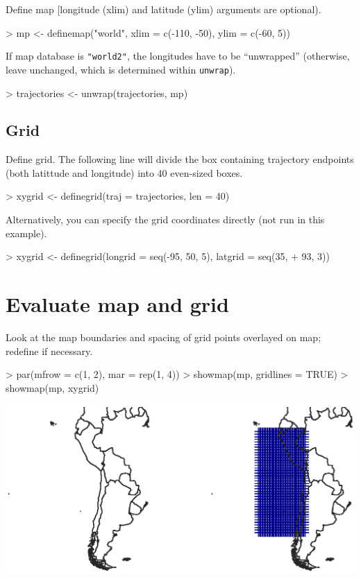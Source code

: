 \documentclass{article}
\renewenvironment{Schunk}{\vspace{\topsep}}{\vspace{\topsep}}
\begin{document}
Define map [longitude (xlim) and latitude (ylim) arguments are
optional).

\begin{Schunk}
\begin{Sinput}
> mp <- definemap("world", xlim = c(-110, -50), ylim = c(-60, 5))
\end{Sinput}
\end{Schunk}

If map database is \verb~"world2"~, the longitudes have to be ``unwrapped'' (otherwise, leave unchanged, which is determined within \verb~unwrap~). 
\begin{Schunk}
\begin{Sinput}
> trajectories <- unwrap(trajectories, mp)
\end{Sinput}
\end{Schunk}


\subsection{Grid}
Define grid. The following line will divide the box containing trajectory
endpoints (both latittude and longitude) into 40 even-sized boxes.
\begin{Schunk}
\begin{Sinput}
> xygrid <- definegrid(traj = trajectories, len = 40)
\end{Sinput}
\end{Schunk}

Alternatively, you can specify the grid coordinates directly (not run in this example).
\begin{Schunk}
\begin{Sinput}
> xygrid <- definegrid(longrid = seq(-95, 50, 5), latgrid = seq(35, 
+     93, 3))
\end{Sinput}
\end{Schunk}

\section{Evaluate map and grid}

Look at the map boundaries and spacing of grid points overlayed on
map; redefine if necessary. 

\begin{Schunk}
\begin{Sinput}
> par(mfrow = c(1, 2), mar = rep(1, 4))
> showmap(mp, gridlines = TRUE)
> showmap(mp, xygrid)
\end{Sinput}
\end{Schunk}
\includegraphics{figures/fig-012}
\end{document}
